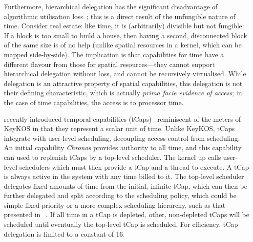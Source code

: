 Furthermore, hierarchical delegation has the significant disadvantage
of algorithmic utilisation loss~\citep{Lackorzynski_WVH_12}; this is a
direct result of the unfungible nature of time. Consider real
estate: like time, it is (arbitrarily) divisible but not fungible: If
a block is too small to build a house, then having a second,
disconnected block of the same size is of no help (unlike spatial resources in a kernel, which can
be mapped side-by-side). The implication is
that capabilities for time have a different flavour from those for
spatial resources---they cannot support hierarchical delegation
without loss, and cannot be recursively virtualised. While delegation is an
attractive property of spatial capabilities,
this delegation is not their defining characteristic, which is actually
\emph{prima facie evidence of access}; in the case of time
capabilities, the access is to processor time.

\composite recently introduced temporal capabilities
(tCaps)~\citep{Gadepalli_GBKP_17} reminiscent of
the meters of KeyKOS in that they represent a scalar unit of time.
Unlike KeyKOS, tCaps integrate with user-level scheduling, decoupling access control
from scheduling. An initial capability \emph{Chronos} provides authority to all time, and this capability
can used to replenish tCaps by a top-level scheduler. The kernel up calls user-level schedulers 
which must then provide a tCap and a thread to execute. A tCap is always active in the system with
any time billed to it. The top-level scheduler delegates fixed amounts of time from the initial,
infinite tCap, which can then be further delegated and split according to the scheduling policy,
which could be simple fixed-priority or a more complex scheduling hierarchy, such as that presented
in \hires~\citep{Parmer_West_11}. If all time
in a tCap is depleted, other, non-depleted tCaps will be scheduled until eventually the top-level
tCap is scheduled. For efficiency, tCap delegation is limited to a constant of 16. 

